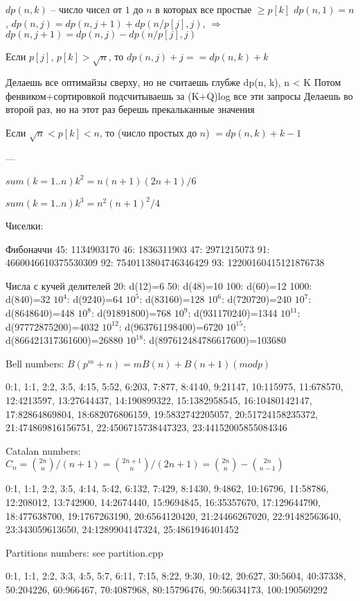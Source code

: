 $dp(n, k)$ -- число чисел от $1$ до $n$ в которых все простые $\ge p[k]$
$dp(n, 1) = n$, $dp(n, j) = dp(n, j + 1) + dp(n / p[j], j)$, $\Rightarrow$ $dp(n, j + 1) = dp(n, j) - dp(n / p[j], j)$

Если $p[j]$, $p[k] > \sqrt{n}$, то $dp(n, j) + j == dp(n, k) + k$

Делаешь все оптимайзы сверху, но не считаешь глубже dp(n, k), n < K
Потом фенвиком+сортировкой подсчитываешь за (K+Q)log все эти запросы
Делаешь во второй раз, но на этот раз берешь прекальканные значения

Если $\sqrt{n} < p[k] < n$, то (число простых до $n$) $= dp(n, k) + k - 1$

---

$sum(k=1..n) k^2 = n(n+1)(2n+1)/6$

$sum(k=1..n) k^3 = n^2(n+1)^2/4$


Чиселки: 

Фибоначчи
45:  1134903170
46:  1836311903
47:  2971215073
91:  4660046610375530309
92:  7540113804746346429
93:  12200160415121876738

Числа с кучей делителей
20: d(12)=6
50: d(48)=10
100: d(60)=12
1000: d(840)=32
$10^4$: d(9240)=64
$10^5$: d(83160)=128
$10^6$: d(720720)=240
$10^7$: d(8648640)=448
$10^8$: d(91891800)=768
$10^9$: d(931170240)=1344
$10^{11}$: d(97772875200)=4032
$10^{12}$: d(963761198400)=6720
$10^{15}$: d(866421317361600)=26880
$10^{18}$: d(897612484786617600)=103680

Bell numbers:
$B(p^m + n) = mB(n) + B(n + 1) (mod p)$

0:1, 1:1, 2:2, 3:5, 4:15, 5:52, 6:203, 7:877, 8:4140, 9:21147,
10:115975, 11:678570, 12:4213597, 13:27644437, 14:190899322,
15:1382958545, 16:10480142147, 17:82864869804, 18:682076806159,
19:5832742205057, 20:51724158235372, 21:474869816156751,
22:4506715738447323, 23:44152005855084346

Catalan numbers:
$C_n = \binom{2n}{n} / (n + 1) = \binom{2n + 1}{n} / (2n + 1) = \binom{2n}{n} - \binom{2n}{n - 1}$

0:1, 1:1, 2:2, 3:5, 4:14, 5:42, 6:132, 7:429, 8:1430, 9:4862,
10:16796, 11:58786, 12:208012, 13:742900, 14:2674440,
15:9694845, 16:35357670, 17:129644790, 18:477638700,
19:1767263190, 20:6564120420, 21:24466267020, 22:91482563640,
23:343059613650, 24:1289904147324, 25:4861946401452

Partitions numbers:
see partition.cpp

0:1, 1:1, 2:2, 3:3, 4:5, 5:7, 6:11, 7:15, 8:22, 9:30, 10:42, 20:627, 30:5604, 40:37338, 50:204226, 60:966467, 70:4087968, 80:15796476, 90:56634173, 100:190569292

